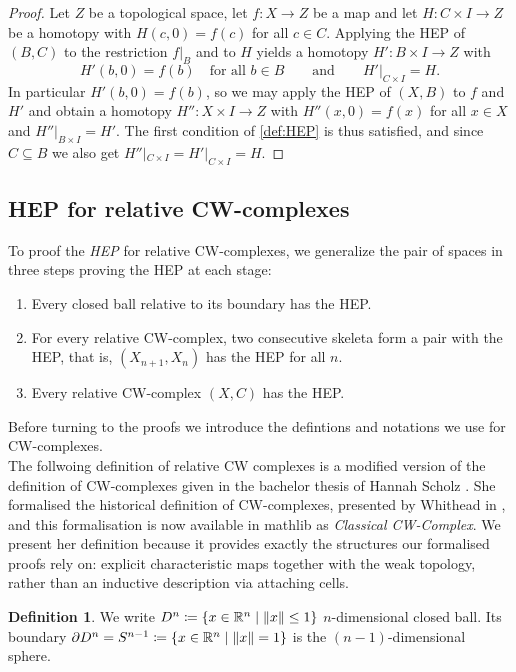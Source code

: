 \documentclass[11pt, a4paper, english]{article}
\DeclarePairedDelimiter\norm{\lVert}{\rVert}
\theoremstyle{plain}
\theoremstyle{definition}
\newtheorem{definition}[theorem]{Definition}
\theoremstyle{remark}
\numberwithin{equation}{section}
\numberwithin{theorem}{section}
\begin{document}
\begin{proof}
    Let $Z$ be a topological space, let $f \colon X \to Z$ be a map and let $H \colon C \times I \to Z$ be a homotopy with $H(c,0) = f(c)$ for all $c \in C$. Applying the HEP of $(B,C)$ to the restriction $f|_B$ and to $H$ yields a homotopy $H' \colon B \times I \to Z$ with
    \[
        H'(b,0) = f(b) \quad \text{for all } b \in B
        \qquad\text{and}\qquad
        H'|_{C \times I} = H .
    \]
    In particular $H'(b,0) = f(b)$, so we may apply the HEP of $(X,B)$ to $f$ and $H'$ and obtain a homotopy $H'' \colon X \times I \to Z$ with $H''(x,0) = f(x)$ for all $x \in X$ and $H''|_{B \times I} = H'$. The first condition of \cref{def:HEP} is thus satisfied, and since $C \subseteq B$ we also get $H''|_{C \times I} = H'|_{C \times I} = H$.
\end{proof}

\subsection{HEP for relative CW-complexes} \label{subsec:HEP_relCW}

To proof the \emph{HEP} for relative CW-complexes, we generalize the pair of spaces in three steps proving the HEP at each stage:
\begin{enumerate}
    \item Every closed ball relative to its boundary has the HEP. 
    \item For every relative CW-complex, two consecutive skeleta form a pair with the HEP, that is, $(X_{n+1}, X_n)$ has the HEP for all $n$.
    \item Every relative CW-complex $(X,C)$ has the HEP.
\end{enumerate}

Before turning to the proofs we introduce the defintions and notations we use for CW-complexes.\\
The follwoing definition of relative CW complexes is a modified version of the definition of CW-complexes given in the bachelor thesis of Hannah Scholz \cite{SCH01}. She formalised the historical definition of CW-complexes, presented by Whithead in \cite{WH}, and this formalisation is now available in mathlib as \emph{Classical CW-Complex}. We present her definition because it provides exactly the structures our formalised proofs rely on: explicit characteristic maps together with the weak topology, rather than an inductive description via attaching cells.

\begin{definition}
We write $D^n \coloneqq \{ x \in \mathbb{R}^n \mid \norm{x} \le 1 \}$ $n$-dimensional closed ball.
Its boundary $\partial D^n = S^{n-1} \coloneqq \{ x \in \mathbb{R}^n \mid \norm{x} = 1\} $ is the $(n-1)$-dimensional sphere.
\end{definition}
\end{document}
